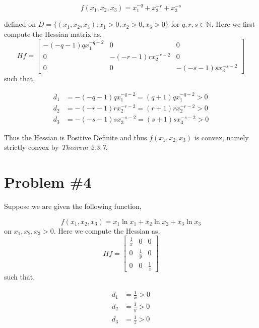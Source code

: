 \documentclass{article}
\newcommand{\NN}{\mathbb{N}}
\begin{document}
\begin{equation*}
    f(x_1,x_2,x_3) = x_1^{-q}+x_2^{-r} + x_3^{-s}
\end{equation*}

defined on $D = \{(x_1,x_2,x_3) : x_1 > 0, x_2 > 0, x_3 > 0\}$ for $q,r,s \in \NN$. Here we first compute the Hessian matrix as,
\begin{equation*}
    Hf = \begin{bmatrix*}
        -(-q-1)qx_1^{-q-2} & 0 & 0 \\
        0 & -(-r-1)rx_2^{-r-2} & 0 \\
        0 & 0 & -(-s-1)sx_3^{-s-2}
    \end{bmatrix*}
\end{equation*}
such that,

\begin{align*}
    d_1 &=  -(-q-1)qx_1^{-q-2} = (q + 1)qx_1^{-q-2} > 0\\
    d_2 &= -(-r-1)rx_2^{-r-2} = (r+1)rx_2^{-r-2} > 0\\
    d_3 &= -(-s-1)sx_3^{-s-2} = (s + 1)sx_3^{-s-2} > 0
\end{align*}

Thus the Hessian is Positive Definite and thus $f(x_1,x_2,x_3)$ is convex, namely strictly convex by \textit{Theorem 2.3.7}.

\section*{Problem \#4}
Suppose we are given the following function,

\begin{equation*}
    f(x_1,x_2,x_3) = x_1\ln{x_1} + x_2\ln{x_2} + x_3\ln{x_3}
\end{equation*}
on $x_1,x_2,x_3 > 0$. Here we compute the Hessian as,
\begin{equation*}
    Hf = \begin{bmatrix*}
        \frac{1}{x} & 0 & 0 \\
        0 & \frac{1}{y} & 0 \\
        0 & 0 & \frac{1}{z}
    \end{bmatrix*}
\end{equation*}
such that,

\begin{align*}
    d_1 &=  \frac{1}{x} > 0\\
    d_2 &= \frac{1}{y}> 0\\
    d_3 &= \frac{1}{z} > 0
\end{align*}
\end{document}

